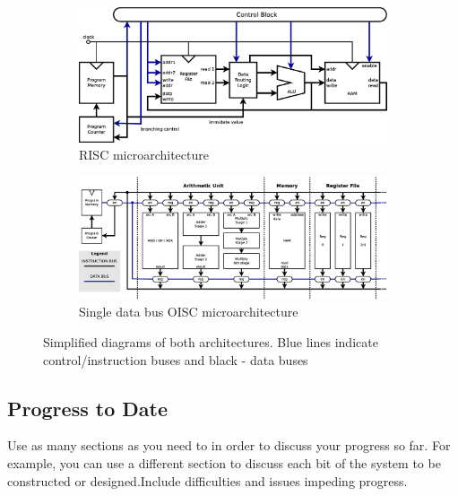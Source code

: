 \documentclass[a4paper,12pt]{article}
\begin{document}
\begin{multicols}{2}
\begin{figure}
	\centering
	\begin{subfigure}[b]{1\textwidth}
		\includegraphics[width=\linewidth]{graphics/risc.eps}
		\caption{RISC microarchitecture}
		\label{fig:risc_simple}
	\end{subfigure}
	
	\begin{subfigure}[b]{1\textwidth}
		\includegraphics[width=\linewidth]{graphics/oisc.eps}
		\caption{Single data bus OISC microarchitecture}
		\label{fig:oisc_simple}
	\end{subfigure}
	
	\caption{Simplified diagrams of both architectures. Blue lines indicate control/instruction buses and black - data buses}
	\label{fig:simple_blocks}
\end{figure}

\subsection{Progress to Date}
Use as many sections as you need to in order to discuss your progress so far. For example, you can use a different section to discuss each bit of the system to be constructed or designed.Include difficulties and issues impeding progress.


\end{multicols}
\end{document}
